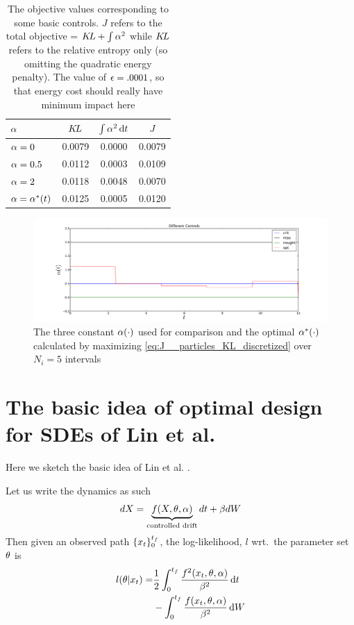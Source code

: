 \documentclass{article}
\begin{document}
\begin{table}
\begin{center}
\begin{tabular}{lccc}
${\alpha}$ & ${ K\!L}$& $\int {\alpha}^2 \, \mathrm{d} t$ & $J$ \\
\hline
${\alpha} = 0$   		&  0.0079 &  0.0000 &   0.0079   \\
${\alpha} = 0.5$ 		&   0.0112 &  0.0003 &   0.0109   \\
${\alpha} = 2$   		&   0.0118 &  0.0048 &   0.0070  \\
${\alpha} = {\alpha}^*(t)$ 	&   0.0125 &  0.0005 &   0.0120  \\  
\end{tabular}
\caption{The objective values corresponding to some basic controls. $J$ refers
to the total objective = ${ K\!L} + \int {\alpha}^2 $ while ${ K\!L}$ refers to the relative
entropy only (so omitting the quadratic energy penalty). The value of ${\epsilon} =
.0001$, so that energy cost should really have minimum impact here}
\label{tab:objective_values_uniform_prior}
\end{center}
\end{table}
\begin{figure}[htp]
\begin{center}
  \includegraphics[width=1\textwidth]{Figs/ControlOptimizer/basic_test_controls.pdf}
  \caption{The three constant ${\alpha}(\cdot)$ used for comparison and the optimal
  ${\alpha}^*(\cdot)$ calculated by maximizing \cref{eq:J__particles_KL_discretized} over $N_i = 5$ intervals}
  \label{fig:basic_test_controls}
\end{center}
\end{figure}
\clearpage


\appendix
\section{The basic idea of optimal design for SDEs of Lin et al.}
Here we sketch the basic idea of Lin et al. \cite{Lin}. 

Let us write the dynamics as such
\begin{equation}
dX = \underbrace{f(X,{\theta}, {\alpha})}_{\textrm{controlled drift}}dt
+ {\beta} dW
\end{equation}
Then given an observed path $\{x_t\}_0^{ t_f }$, the log-likelihood, $l$ wrt.\ the
parameter set ${\theta}$ is
\begin{align}
l({\theta} | x_t) =&  \frac 12 \int_0^{ t_f } \frac{f^2(x_t,{\theta}, {\alpha})}{{\beta}^2} \, \mathrm{d} t
\notag
\\
&- \int_0^{ t_f }  \frac{f(x_t,{\theta}, {\alpha})}{{\beta}^2} \, \mathrm{d} W
\label{eq:log_likelihood_cts_time}
\end{align}
\end{document}
